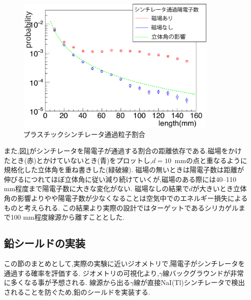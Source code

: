\begin{figure}[!tbp]
	\centering
		\includegraphics[width=10cm]{fig/scinti_test.pdf}
	\caption{プラスチックシンチレータ通過粒子割合}
	\label{scinti_test}
\end{figure}


また,図\ref{scinti_test}がシンチレータを陽電子が通過する割合の距離依存である.磁場をかけたとき(赤)とかけていないとき(青)をプロットし,$d=10$\, mmの点と重なるように規格化した立体角を重ね書きした(緑破線).
磁場の無いときは陽電子数は距離が伸びるにつれてほぼ立体角に従い減り続けていくが,磁場のある際には40--110 mm程度まで陽電子数に大きな変化がない.
磁場なしの結果で$d$が大きいとき立体角の影響よりやや陽電子数が少なくなることは空気中でのエネルギー損失によるものと考えられる.
この結果より実際の設計ではターゲットであるシリカゲルまで100 mm程度線源から離すこととした.

\subsection{鉛シールドの実装}
この節のまとめとして,実際の実験に近いジオメトリで,陽電子がシンチレータを通過する確率を評価する.
ジオメトリの可視化より,$\gamma$線バックグラウンドが非常に多くなる事が予想される.
線源から出る$\gamma$線が直接NaI(Tl)シンチレータで検出されることを防ぐため,鉛のシールドを実装する.

